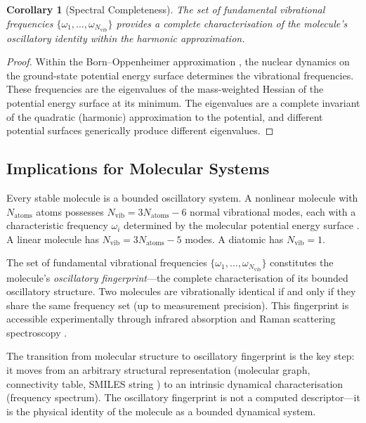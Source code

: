 \documentclass[11pt,twocolumn,a4paper]{article}
\newtheorem{corollary}[theorem]{Corollary}
\theoremstyle{definition}
\theoremstyle{remark}
\newcommand{\Nvib}{N_{\mathrm{vib}}}
\begin{document}
\begin{corollary}[Spectral Completeness]
\label{cor:spectral_complete}
The set of fundamental vibrational frequencies $\{\omega_1, \ldots, \omega_{\Nvib}\}$ provides a complete characterisation of the molecule's oscillatory identity within the harmonic approximation.
\end{corollary}

\begin{proof}
Within the Born--Oppenheimer approximation \citep{born1927}, the nuclear dynamics on the ground-state potential energy surface determines the vibrational frequencies. These frequencies are the eigenvalues of the mass-weighted Hessian of the potential energy surface at its minimum. The eigenvalues are a complete invariant of the quadratic (harmonic) approximation to the potential, and different potential surfaces generically produce different eigenvalues.
\end{proof}

\subsection{Implications for Molecular Systems}

Every stable molecule is a bounded oscillatory system. A nonlinear molecule with $N_{\mathrm{atoms}}$ atoms possesses $\Nvib = 3N_{\mathrm{atoms}} - 6$ normal vibrational modes, each with a characteristic frequency $\omega_i$ determined by the molecular potential energy surface \citep{wilson1955}. A linear molecule has $\Nvib = 3N_{\mathrm{atoms}} - 5$ modes. A diatomic has $\Nvib = 1$.

The set of fundamental vibrational frequencies $\{\omega_1, \ldots, \omega_{\Nvib}\}$ constitutes the molecule's \emph{oscillatory fingerprint}---the complete characterisation of its bounded oscillatory structure. Two molecules are vibrationally identical if and only if they share the same frequency set (up to measurement precision). This fingerprint is accessible experimentally through infrared absorption and Raman scattering spectroscopy \citep{wilson1955, herzberg1945}.

The transition from molecular structure to oscillatory fingerprint is the key step: it moves from an arbitrary structural representation (molecular graph, connectivity table, SMILES string \citep{weininger1988}) to an intrinsic dynamical characterisation (frequency spectrum). The oscillatory fingerprint is not a computed descriptor---it is the physical identity of the molecule as a bounded dynamical system.
\end{document}
